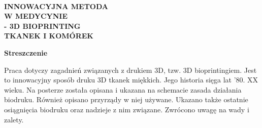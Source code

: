 \documentclass[a4paper,12pt]{article}
\begin{document}
	\thispagestyle {empty}
 



\hspace{8.7cm}{\LARGE Wiktoria Wojnarowska }

\hspace{11cm}{\LARGE Anna Korbecka }

\hspace{8.4cm}{\LARGE Politechnika Rzeszowska }

\hspace{13.1cm}{\LARGE WMiFS}\ \\

\hspace{9.5cm}{\LARGE Koło Naukowe Foton}


\vspace{4cm}

	

	{ \Huge \hspace{1.5cm}\textbf{INNOWACYJNA METODA }}\ \\
	
		{\Huge \hspace{4cm}\textbf{W MEDYCYNIE} }\ \\
		
		{\Huge  \hspace{3.5cm}\textbf{- 3D BIOPRINTING }}\ \\
		
		{\Huge  \hspace{3cm}\textbf{TKANEK I KOMÓREK}}
		
		 
\vspace{2.5cm}

\begin{center}
	{\LARGE \textbf{Streszczenie}}
\end{center}

Praca dotyczy zagadnień związanych z drukiem 3D, tzw. 3D bioprintingiem. Jest to innowacyjny sposób druku 3D tkanek miękkich. Jego historia sięga lat ’80. XX  wieku. Na posterze została opisana i ukazana na schemacie zasada działania biodruku. Również opisano przyrządy w niej używane. Ukazano także ostatnie osiągnięcia biodruku oraz nadzieje z nim związane. Zwrócono uwagę na wady i zalety. 
\end{document}
